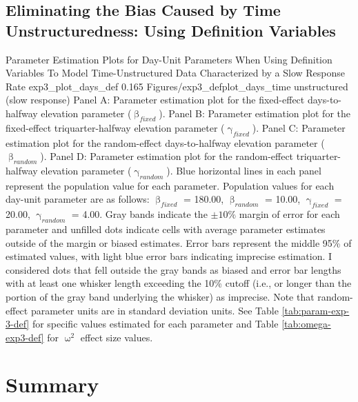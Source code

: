 \documentclass[
12pt, %
twoside,
english]{guelphthesis}
\begin{document}
\hypertarget{eliminating-the-bias-caused-by-time-unstructuredness-using-definition-variables}{%
\subsection{Eliminating the Bias Caused by Time Unstructuredness: Using Definition Variables}\label{eliminating-the-bias-caused-by-time-unstructuredness-using-definition-variables}}
\begin{apaFigure}
[portrait]
[samepage]
[-0.2cm]
{Parameter Estimation Plots for Day-Unit Parameters When Using Definition Variables To Model Time-Unstructured Data Characterized by a Slow Response Rate}
{exp3_plot_days_def}
{0.165}
{Figures/exp3_defplot_days_time unstructured (slow response)}
{Panel A: Parameter estimation plot for the fixed-effect days-to-halfway elevation parameter ($\upbeta_{fixed}$). Panel B: Parameter estimation plot for the fixed-effect triquarter-halfway elevation parameter ($\upgamma_{fixed}$). Panel C: Parameter estimation plot for the random-effect days-to-halfway elevation parameter ($\upbeta_{random}$). Panel D: Parameter estimation plot for the random-effect triquarter-halfway elevation parameter ($\upgamma_{random}$). Blue horizontal lines in each panel represent the population value for each parameter. Population values for each day-unit parameter are as follows: $\upbeta_{fixed}$ = 180.00, $\upbeta_{random}$ = 10.00, $\upgamma_{fixed}$ = 20.00, $\upgamma_{random}$ = 4.00. Gray bands indicate the $\pm 10\%$ margin of error for each parameter and unfilled dots indicate cells with average parameter estimates outside of the margin or biased estimates. Error bars represent the middle 95\% of estimated values, with light blue error bars indicating imprecise estimation. I considered dots that fell outside the gray bands as biased and error bar lengths with at least one whisker length exceeding the 10\% cutoff (i.e., or longer than the portion of the gray band underlying the whisker) as imprecise. Note that random-effect parameter units are in standard deviation units. See Table \ref{tab:param-exp-3-def} for specific values estimated for each parameter and Table \ref{tab:omega-exp3-def} for $\upomega^2$ effect size values.}
\end{apaFigure}
\hypertarget{summary-1}{%
\section{Summary}\label{summary-1}}

\newpage
\end{document}
